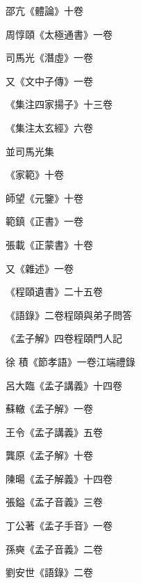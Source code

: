 \begin{pinyinscope}
 邵亢《體論》十卷



 周惇頤《太極通書》一卷



 司馬光《潛虛》一卷



 又《文中子傳》一卷



 《集注四家揚子》十三卷



 《集注太玄經》六卷



 並司馬光集



 《家範》十卷



 師望《元鑒》十卷



 範鎮《正書》一卷



 張載《正蒙書》十卷



 又《雜述》一卷



 《程頤遺書》二十五卷



 《語錄》二卷程頤與弟子問答



 《孟子解》四卷程頤門人記



 徐
 積《節孝語》一卷江端禮錄



 呂大臨《孟子講義》十四卷



 蘇轍《孟子解》一卷



 王令《孟子講義》五卷



 龔原《孟子解》十卷



 陳暘《孟子解義》十四卷



 張鎰《孟子音義》三卷



 丁公著《孟子手音》一卷



 孫奭《孟子音義》二卷



 劉安世《語錄》二卷




\end{pinyinscope}
